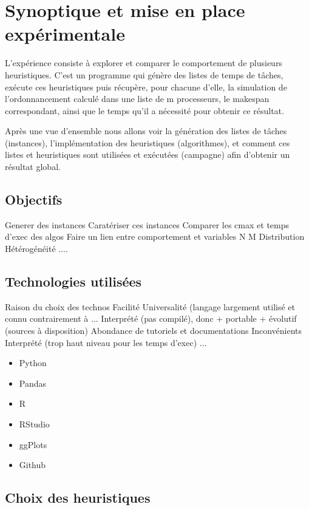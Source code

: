 \documentclass[a4paper,12pt]{report}
\theoremstyle{plain}				%
\theoremstyle{definition}				%
\begin{document}
\section{Synoptique et mise en place expérimentale}\label{sec:Synoptique}

L’expérience consiste à explorer et comparer le comportement de plusieurs heuristiques. 
C'est un programme qui génère des listes de temps de tâches, 
  exécute ces heuristiques puis récupère, pour chacune d'elle, 
  la simulation de l’ordonnancement calculé dans une liste de m processeurs, 
  le makespan correspondant, ainsi que le temps qu'il a nécessité pour obtenir ce résultat.

Après une vue d'ensemble nous allons voir la génération des listes de tâches (instances), l'implémentation des heuristiques (algorithmes), et comment ces listes et heuristiques sont utilisées et exécutées (campagne) afin d'obtenir un résultat global.

\subsection{Objectifs}\label{ssec:Objectifs}
Generer des instances
Caratériser ces instances
Comparer les cmax et temps d'exec des algos
Faire un lien entre comportement et variables
 N
 M
 Distribution
 Hétérogénéité
 ....
 

\subsection{Technologies utilisées}\label{ssec:TechnologiesUtilisées}
Raison du choix des technos
 Facilité
 Universalité (langage largement utilisé et connu contrairement à ...
 Interprété (pas compilé), donc + portable + évolutif (sources à disposition)
 Abondance de tutoriels et documentations
Inconvénients
 Interprété (trop haut niveau pour les temps d'exec)
 ... 

\begin{itemize}

\item Python
\item Pandas
\item R
\item RStudio
\item ggPlots
\item Github


\end{itemize}

\subsection{Choix des heuristiques}\label{ssec:choixHeuristiques}
\end{document}
